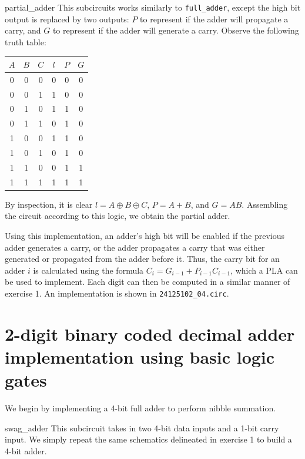 \documentclass{exam}
\newcommand{\lxor}{\oplus}
\begin{document}
\begin{subcircuit}{partial\_adder}
	This subcircuits works similarly to \verb|full_adder|, except the high bit output is replaced by two outputs: $P$ to represent if the adder will propagate a carry, and $G$ to represent if the adder will generate a carry. Observe the following truth table:
	\begin{center}
		\bgroup
		\def\arraystretch{1.2}
		\begin{tabular}{ccc|ccc}
			$A$ & $B$ & $C$ & $l$ & $P$ & $G$ \\
			\hline
			0 & 0 & 0 & 0 & 0 & 0 \\
			0 & 0 & 1 & 1 & 0 & 0 \\
			0 & 1 & 0 & 1 & 1 & 0 \\
			0 & 1 & 1 & 0 & 1 & 0 \\
			1 & 0 & 0 & 1 & 1 & 0 \\
			1 & 0 & 1 & 0 & 1 & 0 \\
			1 & 1 & 0 & 0 & 1 & 1 \\
			1 & 1 & 1 & 1 & 1 & 1
		\end{tabular}
		\egroup
	\end{center}
	By inspection, it is clear $l = A \lxor B \lxor C$, $P = A + B$, and $G = AB$. Assembling the circuit according to this logic, we obtain the partial adder.
\end{subcircuit}

Using this implementation, an adder's high bit will be enabled if the previous adder generates a carry, or the adder propagates a carry that was either generated or propagated from the adder before it. Thus, the carry bit for an adder $i$ is calculated using the formula $C_i = G_{i - 1} + P_{i - 1}C_{i - 1}$, which a PLA can be used to implement. Each digit can then be computed in a similar manner of exercise 1. An implementation is shown in \verb|24125102_04.circ|.

\section{2-digit binary coded decimal adder implementation using basic logic gates}
We begin by implementing a 4-bit full adder to perform nibble summation.
\begin{subcircuit}{swag\_adder}
	This subcircuit takes in two 4-bit data inputs and a 1-bit carry input. We simply repeat the same schematics delineated in exercise 1 to build a 4-bit adder.
\end{subcircuit}
\end{document}
